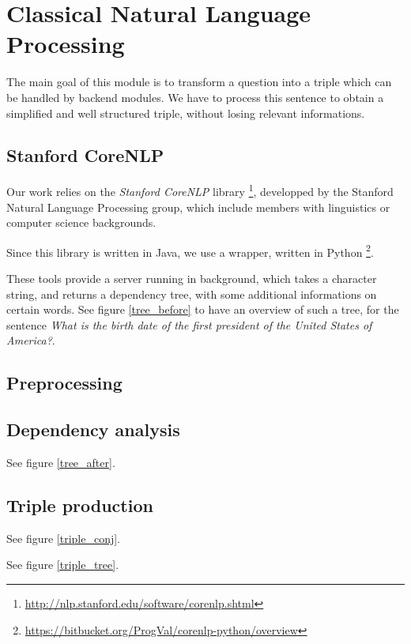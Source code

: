 \chapter{Classical Natural Language Processing}

The main goal of this module is to transform a question into a triple which can
be handled by backend modules. We have to process this sentence to obtain a simplified
and well structured triple, without losing relevant informations.

\section{Stanford CoreNLP}

Our work relies on the \emph{Stanford CoreNLP} library
\footnote{\url{http://nlp.stanford.edu/software/corenlp.shtml}}, developped by
the Stanford Natural Language Processing group, which include members with 
linguistics or computer science backgrounds. 

Since this library is written in Java, we use a wrapper, written in Python
\footnote{\url{https://bitbucket.org/ProgVal/corenlp-python/overview}}.

These tools provide a server running in background, which takes a character string,
and returns a dependency tree, with some additional informations on certain words.
See figure \ref{tree_before} to have an overview of such a tree, for the sentence
\emph{What is the birth date of the first president of the United States of America?}.


\section{Preprocessing}


\section{Dependency analysis}

See figure \ref{tree_after}.


\section{Triple production}

See figure \ref{triple_conj}.

See figure \ref{triple_tree}.
